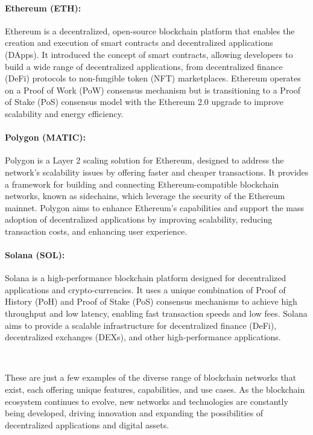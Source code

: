 \paragraph{Ethereum (ETH):}
Ethereum is a decentralized, open-source blockchain platform that enables the creation and execution of smart contracts and decentralized applications (DApps). It introduced the concept of smart contracts, allowing developers to build a wide range of decentralized applications, from decentralized finance (DeFi) protocols to non-fungible token (NFT) marketplaces. Ethereum operates on a Proof of Work (PoW) consensus mechanism but is transitioning to a Proof of Stake (PoS) consensus model with the Ethereum 2.0 upgrade to improve scalability and energy efficiency.

\paragraph{Polygon (MATIC):}
Polygon is a Layer 2 scaling solution for Ethereum, designed to address the network's scalability issues by offering faster and cheaper transactions. It provides a framework for building and connecting Ethereum-compatible blockchain networks, known as sidechains, which leverage the security of the Ethereum mainnet. Polygon aims to enhance Ethereum's capabilities and support the mass adoption of decentralized applications by improving scalability, reducing transaction costs, and enhancing user experience.

\paragraph{Solana (SOL):}
Solana is a high-performance blockchain platform designed for decentralized applications and crypto-currencies. It uses a unique combination of Proof of History (PoH) and Proof of Stake (PoS) consensus mechanisms to achieve high throughput and low latency, enabling fast transaction speeds and low fees. Solana aims to provide a scalable infrastructure for decentralized finance (DeFi), decentralized exchanges (DEXs), and other high-performance applications.

~

These are just a few examples of the diverse range of blockchain networks that exist, each offering unique features, capabilities, and use cases. As the blockchain ecosystem continues to evolve, new networks and technologies are constantly being developed, driving innovation and expanding the possibilities of decentralized applications and digital assets.

